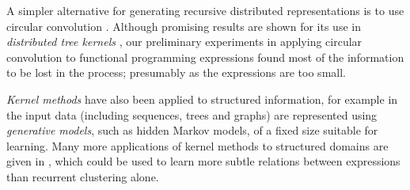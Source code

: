 A simpler alternative for generating recursive distributed representations is to
use circular convolution \cite{conf/ijcai/Plate91}. Although promising results
are shown for its use in \emph{distributed tree kernels}
\cite{zanzotto2012distributed}, our preliminary experiments in applying
circular convolution to functional programming expressions found most of the
information to be lost in the process; presumably as the expressions are too
small.

\emph{Kernel methods} have also been applied to structured information, for
example in \cite{Gartner2003} the input data (including sequences, trees and
graphs) are represented using \emph{generative models}, such as hidden Markov
models, of a fixed size suitable for learning. Many more applications of kernel
methods to structured domains are given in \cite{bakir2007predicting}, which
could be used to learn more subtle relations between expressions than recurrent
clustering alone.

